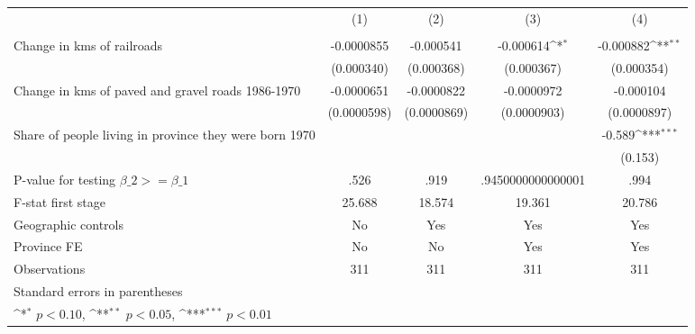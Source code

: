 {
\def\sym#1{\ifmmode^{#1}\else\(^{#1}\)\fi}
\begin{tabular}{l*{4}{c}}
\hline\hline
                &\multicolumn{1}{c}{(1)}&\multicolumn{1}{c}{(2)}&\multicolumn{1}{c}{(3)}&\multicolumn{1}{c}{(4)}\\
                &\multicolumn{1}{c}{}&\multicolumn{1}{c}{}&\multicolumn{1}{c}{}&\multicolumn{1}{c}{}\\
\hline
Change in kms of railroads&-0.0000855         &-0.000541         &-0.000614\sym{*}  &-0.000882\sym{**} \\
                &(0.000340)         &(0.000368)         &(0.000367)         &(0.000354)         \\
[1em]
Change in kms of paved and gravel roads 1986-1970&-0.0000651         &-0.0000822         &-0.0000972         &-0.000104         \\
                &(0.0000598)         &(0.0000869)         &(0.0000903)         &(0.0000897)         \\
[1em]
Share of people living in province they were born 1970&                  &                  &                  &   -0.589\sym{***}\\
                &                  &                  &                  &  (0.153)         \\
\hline
P-value for testing $\beta\_{2} >= \beta\_{1}$&     .526         &     .919         &.9450000000000001         &     .994         \\
F-stat first stage&   25.688         &   18.574         &   19.361         &   20.786         \\
Geographic controls&       No         &      Yes         &      Yes         &      Yes         \\
Province FE     &       No         &       No         &      Yes         &      Yes         \\
Observations    &      311         &      311         &      311         &      311         \\
\hline\hline
\multicolumn{5}{l}{\footnotesize Standard errors in parentheses}\\
\multicolumn{5}{l}{\footnotesize \sym{*} \(p<0.10\), \sym{**} \(p<0.05\), \sym{***} \(p<0.01\)}\\
\end{tabular}
}
